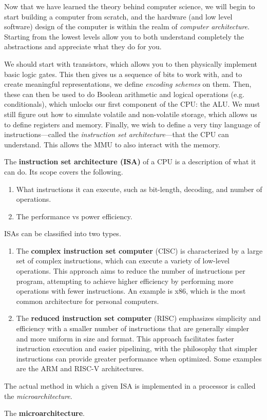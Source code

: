 Now that we have learned the theory behind computer science, we will begin to start building a computer from scratch, and the hardware (and low level software) design of the computer is within the realm of \textit{computer architecture}. Starting from the lowest levels allow you to both understand completely the abstractions and appreciate what they do for you. 

We should start with transistors, which allows you to then physically implement basic logic gates. This then gives us a sequence of bits to work with, and to create meaningful representations, we define \textit{encoding schemes} on them. Then, these can then be used to do Boolean arithmetic and logical operations (e.g. conditionals), which unlocks our first component of the CPU: the ALU. We must still figure out how to simulate volatile and non-volatile storage, which allows us to define registers and memory. Finally, we wish to define a very tiny language of instructions---called the \textit{instruction set architecture}---that the CPU can understand. This allows the MMU to also interact with the memory. 

\begin{definition}
  The \textbf{instruction set architecture (ISA)} of a CPU is a description of what it can do. Its scope covers the following. 
  \begin{enumerate} 
    \item What instructions it can execute, such as bit-length, decoding, and number of operations. 
    \item The performance vs power efficiency. 
  \end{enumerate}
\end{definition}

\begin{example}[]
  ISAs can be classified into two types. 
  \begin{enumerate} 
    \item The \textbf{complex instruction set computer} (CISC) is characterized by a large set of complex instructions, which can execute a variety of low-level operations. This approach aims to reduce the number of instructions per program, attempting to achieve higher efficiency by performing more operations with fewer instructions. An example is x86, which is the most common architecture for personal computers.  
    \item The \textbf{reduced instruction set computer} (RISC) emphasizes simplicity and efficiency with a smaller number of instructions that are generally simpler and more uniform in size and format. This approach facilitates faster instruction execution and easier pipelining, with the philosophy that simpler instructions can provide greater performance when optimized. Some examples are the ARM and RISC-V architectures. 
  \end{enumerate}
\end{example}

The actual method in which a given ISA is implemented in a processor is called the \textit{microarchitecture}. 

\begin{definition}[Microarchitecture]
  The \textbf{microarchitecture}. 
\end{definition}

